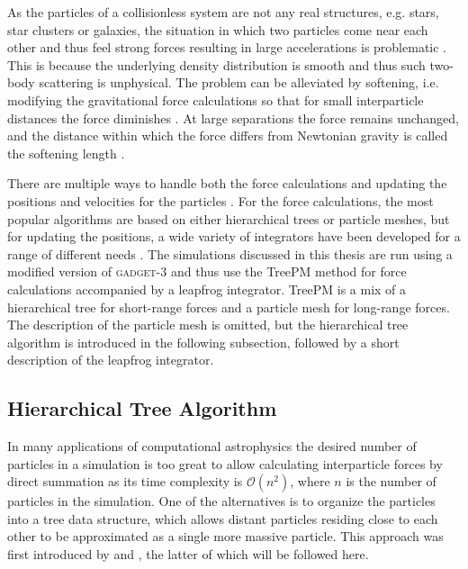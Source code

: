 \documentclass[english, twoside]{HYgradu}
\begin{document}
As the particles of a collisionless system are not any real structures, e.g. stars, star clusters or galaxies, the situation in which two particles come near each other and thus feel strong forces resulting in large accelerations is problematic \citep{binney2008galactic}. This is because the underlying density distribution is smooth and thus such two-body scattering is unphysical. The problem can be alleviated by softening, i.e. modifying the gravitational force calculations so that for small interparticle distances the force diminishes \citep{binney2008galactic}. At large separations the force remains unchanged, and the distance within which the force differs from Newtonian gravity is called the softening length \citep{binney2008galactic}.

There are multiple ways to handle both the force calculations and updating the positions and velocities for the particles \citep{binney2008galactic}. For the force calculations, the most popular algorithms are based on either hierarchical trees or particle meshes, but for updating the positions, a wide variety of integrators have been developed for a range of different needs \citep{binney2008galactic}. The simulations discussed in this thesis are run using a modified version of \textsc{gadget-3} and thus use the TreePM method for force calculations accompanied by a leapfrog integrator. TreePM is a mix of a hierarchical tree for short-range forces and a particle mesh for long-range forces. The description of the particle mesh is omitted, but the \citet{barnes1986hierarchical} hierarchical tree algorithm is introduced in the following subsection, followed by a short description of the leapfrog integrator.

\subsection{Hierarchical Tree Algorithm} \label{sect:tree}
In many applications of computational astrophysics the desired number of particles in a simulation is too great to allow calculating interparticle forces by direct summation as its time complexity is $\mathcal{O}(n^2)$, where $n$ is the number of particles in the simulation. One of the alternatives is to organize the particles into a tree data structure, which allows distant particles residing close to each other to be approximated as a single more massive particle. This approach was first introduced by \citet{appel1985efficient} and \citet{barnes1986hierarchical}, the latter of which will be followed here.
\end{document}
